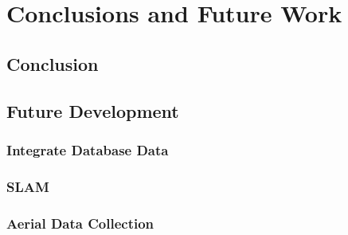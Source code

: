 \section{Conclusions and Future Work}

\subsection{Conclusion}

\subsection{Future Development}

\subsubsection{Integrate Database Data}

\subsubsection{SLAM}

\subsubsection{Aerial Data Collection}